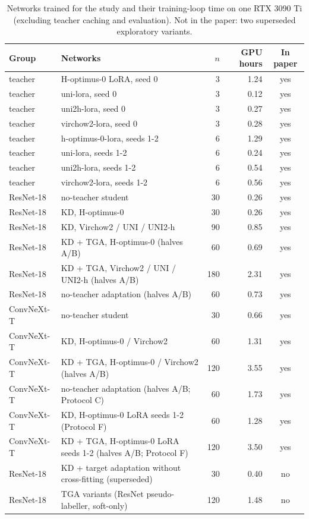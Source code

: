 \begin{table}[htbp]
{\caption{Networks trained for the study and their training-loop time on one RTX 3090 Ti (excluding teacher caching and evaluation). Not in the paper: two superseded exploratory variants.}}
{%
\tiny
\setlength{\tabcolsep}{3pt}
\begin{tabular}{@{}llrrc@{}}
\toprule
Group & Networks & $n$ & GPU hours & In paper \\
\midrule
teacher & H-optimus-0 LoRA, seed 0 & 3 & 1.24 & yes \\
teacher & uni-lora, seed 0 & 3 & 0.12 & yes \\
teacher & uni2h-lora, seed 0 & 3 & 0.27 & yes \\
teacher & virchow2-lora, seed 0 & 3 & 0.28 & yes \\
teacher & h-optimus-0-lora, seeds 1-2 & 6 & 1.29 & yes \\
teacher & uni-lora, seeds 1-2 & 6 & 0.24 & yes \\
teacher & uni2h-lora, seeds 1-2 & 6 & 0.54 & yes \\
teacher & virchow2-lora, seeds 1-2 & 6 & 0.56 & yes \\
ResNet-18 & no-teacher student & 30 & 0.26 & yes \\
ResNet-18 & KD, H-optimus-0 & 30 & 0.26 & yes \\
ResNet-18 & KD, Virchow2 / UNI / UNI2-h & 90 & 0.85 & yes \\
ResNet-18 & KD + TGA, H-optimus-0 (halves A/B) & 60 & 0.69 & yes \\
ResNet-18 & KD + TGA, Virchow2 / UNI / UNI2-h (halves A/B) & 180 & 2.31 & yes \\
ResNet-18 & no-teacher adaptation (halves A/B) & 60 & 0.73 & yes \\
ConvNeXt-T & no-teacher student & 30 & 0.66 & yes \\
ConvNeXt-T & KD, H-optimus-0 / Virchow2 & 60 & 1.31 & yes \\
ConvNeXt-T & KD + TGA, H-optimus-0 / Virchow2 (halves A/B) & 120 & 3.55 & yes \\
ConvNeXt-T & no-teacher adaptation (halves A/B; Protocol C) & 60 & 1.73 & yes \\
ConvNeXt-T & KD, H-optimus-0 LoRA seeds 1-2 (Protocol F) & 60 & 1.28 & yes \\
ConvNeXt-T & KD + TGA, H-optimus-0 LoRA seeds 1-2 (halves A/B; Protocol F) & 120 & 3.50 & yes \\
ResNet-18 & KD + target adaptation without cross-fitting (superseded) & 30 & 0.40 & no \\
ResNet-18 & TGA variants (ResNet pseudo-labeller, soft-only) & 120 & 1.48 & no \\
\bottomrule
\end{tabular}
}
\end{table}
